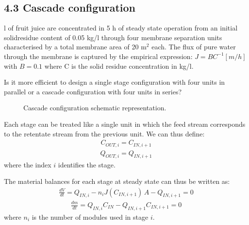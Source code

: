\documentclass[letterpaper,10pt,english]{jupyterBook}
\let\sphinxpxdimen\pdfpxdimen\else\newdimen\sphinxpxdimen
\begin{document}
\subsection{4.3 Cascade configuration}
\label{\detokenize{Process_layouts:cascade-configuration}}
\sphinxAtStartPar
{}

 l of fruit juice are concentrated in 5 h of steady state operation from an initial solid\sphinxhyphen{}residue content of 0.05 kg/l through four membrane separation units characterised by a total membrane area of 20 \(\mathrm{m^2}\) each.
The flux of pure water through the membrane is captured by the empirical expression: \(J=BC^{-1} [m/h]\) with \(B=0.1\) where C is the solid residue concentration in kg/l.

\sphinxAtStartPar
Is it more efficient to design a single stage configuration with four units in parallel or a cascade configuration with four units in series?

\begin{figure}[htbp]
\centering
\capstart

\noindent\sphinxincludegraphics[height=300\sphinxpxdimen]{{cascade}.png}
\caption{Cascade configuration schematic representation.}\label{\detokenize{Process_layouts:id2}}\end{figure}

\sphinxAtStartPar
{}

\sphinxAtStartPar
Each stage can be treated like a single unit in which the feed stream corresponds to the retentate stream from the previous unit.
We can thus define:
\begin{equation}\label{equation:Process_layouts:PLYeq15}
\begin{split}
C_{OUT,i}=C_{IN,i+1}
\end{split}
\end{equation}\begin{equation}\label{equation:Process_layouts:PLYeq16}
\begin{split}
Q_{OUT,i}=Q_{IN,i+1}
\end{split}
\end{equation}
\sphinxAtStartPar
where the index \(i\) identifies the stage.

\sphinxAtStartPar
The material balances for each stage at steady state can thus be written as:
\begin{equation}\label{equation:Process_layouts:PLYeq17}
\begin{split}
\frac{dV}{dt}=Q_{IN,i}-n_iJ(C_{IN,i+1})\,A-Q_{IN,i+1}=0
\end{split}
\end{equation}\begin{equation}\label{equation:Process_layouts:PLYeq18}
\begin{split}
\frac{dm}{dt}=Q_{IN,i}C_{IN}-Q_{IN,i+1}C_{IN,i+1}=0
\end{split}
\end{equation}
\sphinxAtStartPar
where \(n_i\) is the number of modules used in stage \(i\).
\end{document}
